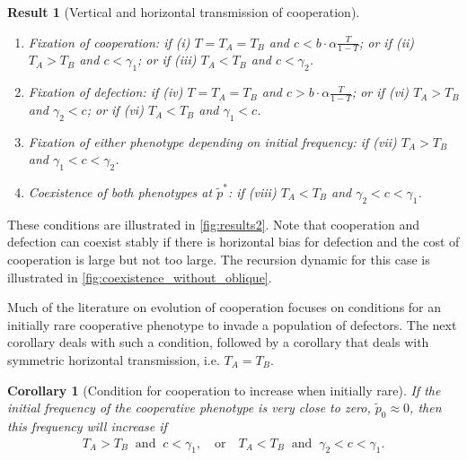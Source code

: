 \documentclass[12pt]{extarticle}
\newtheorem{corollary}{Corollary}
\newtheorem{result}{Result}
\begin{document}
{\begin{result}[Vertical and horizontal transmission of cooperation]
\begin{enumerate} %
\item \emph{Fixation of cooperation}:
	if \emph{(i)} $T=T_A=T_B$ and $c < b \cdot \alpha \frac{T}{1-T}$; or
	if \emph{(ii)} $T_A>T_B$ and $c<\gamma_1$; or
	if \emph{(iii)} $T_A<T_B$ and $c<\gamma_2$.
\item \emph{Fixation of defection}:
	if \emph{(iv)} $T=T_A=T_B$ and $c > b \cdot \alpha \frac{T}{1-T}$; or
	if \emph{(vi)} $T_A>T_B$ and $\gamma_2<c$; or
	if \emph{(vi)} $T_A<T_B$ and $\gamma_1<c$.
\item \emph{Fixation of either phenotype depending on initial frequency}: 
	if \emph{(vii)} $T_A>T_B$ and $\gamma_1<c<\gamma_2$.
\item \emph{Coexistence of both phenotypes at $\tilde{p}^*$}:
	if \emph{(viii)} $T_A<T_B$ and $\gamma_2<c<\gamma_1$.
\end{enumerate}
\end{result}

These conditions are illustrated in \autoref{fig:results2}.
Note that cooperation and defection can coexist stably if there is horizontal bias for defection and the cost of cooperation is large but not too large. The recursion dynamic for this case is illustrated in \autoref{fig:coexistence_without_oblique}.

Much of the literature on evolution of cooperation focuses on conditions for an initially rare cooperative phenotype to invade a population of defectors.
The next corollary deals with such a condition, followed by a corollary that deals with symmetric horizontal transmission, i.e. $T_A=T_B$.
\\

\begin{corollary}[Condition for cooperation to increase when initially rare]
If the initial frequency of the cooperative phenotype is very close to zero, $\tilde{p}_0 \approx 0$, then this frequency will increase if 
\begin{equation} \label{eq:unequal_transmission_from_rarity}
\begin{aligned}
T_A>T_B \;\; \text{and} \;\; c < \gamma_1, \quad \text{or} \quad
T_A<T_B \;\; \text{and} \;\; \gamma_2<c < \gamma_1. 
\end{aligned}
\end{equation} 
\end{corollary}

}
\end{document}
